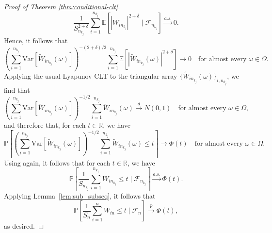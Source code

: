\documentclass[aos]{imsart}
\theoremstyle{plain}
\theoremstyle{remark}
\newcommand{\E}{\mathbb E}								%
\newcommand{\V}{\mathrm{Var}}							%
\newcommand{\R}{\mathbb{R}}								%
\newcommand{\convp}{\overset p \rightarrow}             %
\newcommand{\convd}{\overset d \rightarrow}             %
\newcommand{\convas}{\overset {a.s.} \rightarrow}       %
\begin{document}
\begin{proof}[Proof of Theorem \ref{thm:conditional-clt}]
		\begin{equation}
			\frac{1}{S_{n_{k_j}}^{2+\delta}} \sum_{i = 1}^{n_{k_j}} \E[|W_{in_{k_j}}|^{2+\delta} \mid \mathcal{F}_{n_{k_j}}] \convas 0.
		\end{equation}
		Hence, it follows that 
		\begin{equation}
			\left(\sum_{i = 1}^{n_{k_j}} \V[\widetilde W_{in_{k_j}}(\omega)]\right)^{-(2+\delta)/2}\sum_{i = 1}^{n_{k_j}} \E[|\widetilde W_{i{n_{k_j}}}(\omega)|^{2+\delta}] \rightarrow 0 \quad \text{for almost every } \omega \in \Omega.
		\end{equation}
		Applying the usual Lyapunov CLT to the triangular array $\{\widetilde W_{in_{k_j}}(\omega)\}_{i,n_{k_j}}$, we find that
		\begin{equation}
			\left(\sum_{i = 1}^{n_{k_j}} \V[\widetilde W_{in_{k_j}}(\omega)]\right)^{-1/2}\sum_{i = 1}^{n_{k_j}} \widetilde W_{in_{k_j}}(\omega) \convd N(0,1) \quad \text{for almost every } \omega \in \Omega,
		\end{equation}
		and therefore that, for each $t \in \R$, we have 
		\begin{equation}
			\mathbb P\left[\left(\sum_{i = 1}^{n_{k_j}} \V[\widetilde W_{in_{k_j}}(\omega)]\right)^{-1/2}\sum_{i = 1}^{n_{k_j}} \widetilde W_{in_{k_j}}(\omega) \leq t\right] \rightarrow \Phi(t) \quad \text{for almost every } \omega \in \Omega.
		\end{equation}
		Using \citet[Theorem 8.38]{Lista2017} again, it follows that for each $t \in \R$, we have
		\begin{equation}
			\mathbb P\left[\frac{1}{S_{n_{k_j}}}\sum_{i = 1}^{n_{k_j}} W_{in_{k_j}} \leq t \mid \mathcal F_{n_{k_j}}\right] \convas \Phi(t).
		\end{equation}
		Applying Lemma~\ref{lem:sub_subseq}, it follows that
		\begin{equation}
			\mathbb P\left[\frac{1}{S_{n}}\sum_{i = 1}^{n} W_{in} \leq t \mid \mathcal F_{n}\right] \convp \Phi(t),
		\end{equation}
		as desired.
	\end{proof}
	
\end{document}
